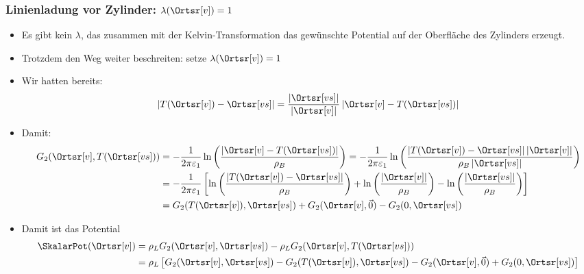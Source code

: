     \begin{frame}
\frametitle{Linienladung vor Zylinder: $\lambda(\Ortsr[v])=1$}
\begin{itemize}[<+->]
\item Es gibt kein $\lambda$, das zusammen mit der Kelvin-Transformation das gewünschte Potential auf der Oberfläche des Zylinders erzeugt.
\item Trotzdem den Weg weiter beschreiten: setze $\lambda(\Ortsr[v])=1$
\item Wir hatten bereits:
  \begin{equation*}
    \left| T(\Ortsr[v]) - \Ortsr[vs]  \right| = \frac{\left| \Ortsr[vs]\right|}{\left| \Ortsr[v]\right|} \left| \Ortsr[v]   - T(\Ortsr[vs]) \right|
  \end{equation*}
\item Damit:
  \begin{align*}
    G_2(\Ortsr[v], T(\Ortsr[vs])) & = -\frac{1}{2\pi\varepsilon_1} \ln\left(\frac{\left|\Ortsr[v] - T(\Ortsr[vs])\right|  }{\rho_B} \right)  = -\frac{1}{2\pi\varepsilon_1} \ln\left(\frac{\left|T(\Ortsr[v]) - \Ortsr[vs]\right|  \left| \Ortsr[v]\right| }{\rho_B \left| \Ortsr[vs]\right|} \right) \\
                                            &= -\frac{1}{2\pi\varepsilon_1} \left[ \ln\left(\frac{\left|T(\Ortsr[v]) - \Ortsr[vs]\right| }{\rho_B } \right) + \ln\left(\frac{ \left| \Ortsr[v]\right| }{\rho_B } \right) - \ln\left(\frac{ \left| \Ortsr[vs]\right| }{\rho_B } \right)  \right]\\
    &= G_2(T(\Ortsr[v]), \Ortsr[vs]) + G_2(\Ortsr[v], \vec{0}) - G_2(0, \Ortsr[vs])    
  \end{align*}
\item Damit ist das Potential
  \begin{align*}
    \SkalarPot(\Ortsr[v]) & = \rho_L G_2(\Ortsr[v], \Ortsr[vs]) -\rho_L G_2(\Ortsr[v], T(\Ortsr[vs])) \\
    &= \rho_L \left[ G_2(\Ortsr[v], \Ortsr[vs]) - G_2(T(\Ortsr[v]), \Ortsr[vs]) - G_2(\Ortsr[v], \vec{0}) + G_2(0, \Ortsr[vs])\right]
    \end{align*}
  \end{itemize}
      \end{frame}

